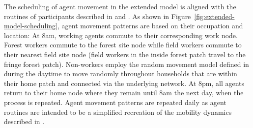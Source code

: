 \begin{figure}[hbt!]
     \centering
     \resizebox{0.95\textwidth}{!}{
        
     }
     \label{fig:extended-model-ii}
\end{figure}




The scheduling of agent movement in the extended model is aligned with the routines of participants described in \citet{sandfort_forest_2020} and \citet{vantaux_anopheles_2021}. As shown in Figure~\ref{fig:extended-model-scheduling}, agent movement patterns are based on their occupation and location: At 8am, working agents commute to their corresponding work node. Forest workers commute to the forest site node while field workers commute to their nearest field site node (field workers in the inside forest patch travel to the fringe forest patch). Non-workers employ the random movement model defined in \citet{manore_network-patch_2015} during the daytime to move randomly throughout households that are within their home patch and connected via the underlying network. At 8pm, all agents return to their home node where they remain until 8am the next day, when the process is repeated. Agent movement patterns are repeated daily as agent routines are intended to be a simplified recreation of the mobility dynamics described in \citet{pepey_mobility_2022}.


